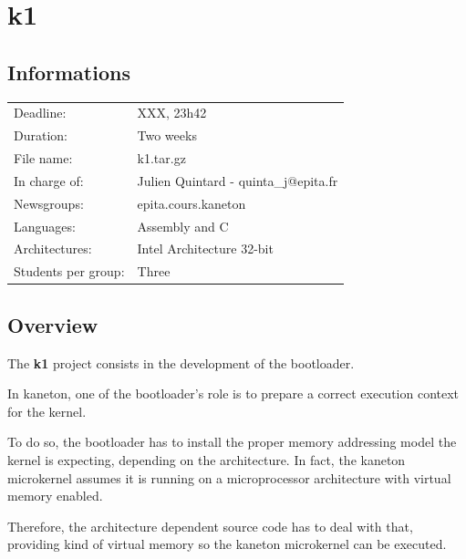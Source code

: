 
%
%

\section{k1}

%
%

\subsection{Informations}

\begin{tabular}{p{7cm}l}
Deadline: & XXX, 23h42 \\
Duration: & Two weeks \\
File name: & k1.tar.gz \\
In charge of: & Julien Quintard - \small{quinta\_j@epita.fr} \\
Newsgroups: & epita.cours.kaneton \\
Languages: & Assembly and C \\
Architectures: & Intel Architecture 32-bit \\
Students per group: & Three \\
\end{tabular}

%
%

\subsection{Overview}

The \textbf{k1} project consists in the development of the bootloader.

In kaneton, one of the bootloader's role is to prepare a correct
execution context for the kernel.

To do so, the bootloader has to install the proper memory addressing model
the kernel is expecting, depending on the architecture. In fact, the
kaneton microkernel assumes it is running on a microprocessor architecture
with virtual memory enabled.

Therefore, the architecture dependent source code has to deal with that,
providing kind of virtual memory so the kaneton microkernel can be executed.

